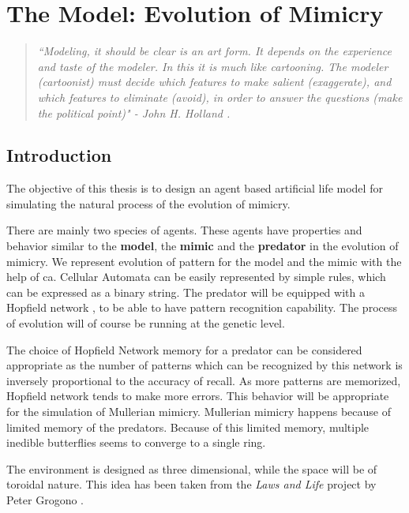 \chapter{The Model: Evolution of Mimicry}
\label{chapter:model}

\begin{quote}
\textsl{``Modeling, it should be clear is an art form. It depends on the experience and taste of the modeler. In this it is much like cartooning. The modeler (cartoonist) must decide which features to make salient (exaggerate), and which features to eliminate (avoid), in order to answer the questions (make the political point)" - John H. Holland \cite{holland1996}.}
\end{quote}

\section{Introduction}
The objective of this thesis is to design an agent based artificial life model for simulating the natural process of the evolution of mimicry.

There are mainly two species of agents. These agents have properties and behavior similar to the \textbf{model}, the \textbf{mimic} and the \textbf{predator} in the evolution of mimicry. We represent evolution of pattern for the model and the mimic with the help of \gls{ca}. Cellular Automata can be easily represented by simple rules, which can be expressed as a binary string. The predator will be equipped with a Hopfield network \cite{hopfield1982}, to be able to have pattern recognition capability. The process of evolution will of course be running at the genetic level. 

The choice of Hopfield Network memory for a predator can be considered appropriate as the number of patterns which can be recognized by this network is inversely proportional to the accuracy of recall. As more patterns are memorized, Hopfield network tends to make more errors. This behavior will be appropriate for the simulation of Mullerian mimicry. Mullerian mimicry happens because of limited memory of the predators. Because of this limited memory, multiple inedible butterflies seems to converge to a single ring.

The environment is designed as three dimensional, while the space will be of toroidal nature. This idea has been taken from the \textsl{Laws and Life} project by Peter Grogono \cite{grogono2003}.

